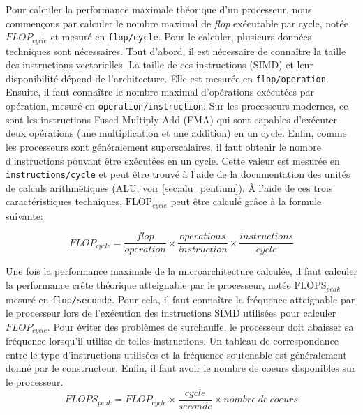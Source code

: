         Pour calculer la performance maximale théorique d'un processeur, nous commençons par calculer le nombre maximal de \textit{flop} exécutable par cycle, notée $FLOP_{cycle}$ et mesuré en \verb=flop/cycle=. Pour le calculer, plusieurs données techniques sont nécessaires. 
        Tout d'abord, il est nécessaire de connaître la taille des instructions vectorielles. La taille de ces instructions (SIMD) et leur disponibilité dépend de l'architecture. Elle est mesurée en \verb=flop/operation=.
        Ensuite, il faut connaître le nombre maximal d'opérations exécutées par opération, mesuré en \verb=operation/instruction=. Sur les processeurs modernes, ce sont les instructions Fused Multiply Add (FMA) qui sont capables d'exécuter deux opérations (une multiplication et une addition) en un cycle.
        Enfin, comme les processeurs sont généralement superscalaires, il faut obtenir le nombre d'instructions pouvant être exécutées en un cycle. Cette valeur est mesurée en \verb=instructions/cycle= et peut être trouvé à l'aide de la documentation des unités de calculs arithmétiques (ALU, voir \autoref{sec:alu_pentium}).
        À l'aide de ces trois caractéristiques techniques, $\text{FLOP}_{cycle}$ peut être calculé grâce à la formule suivante:
        
        \begin{equation}
        \label{eq:floc}
            FLOP_{cycle} = \frac{flop}{operation} \times \frac{operations}{instruction} \times \frac{instructions}{cycle}
        \end{equation}
        
        Une fois la performance maximale de la microarchitecture calculée, il faut calculer la performance crête théorique atteignable par le processeur, notée $\text{FLOPS}_{peak}$ mesuré en \verb=flop/seconde=. Pour cela, il faut connaître la fréquence atteignable par le processeur lors de l'exécution des instructions SIMD utilisées pour calculer $FLOP_{cycle}$. Pour éviter des problèmes de surchauffe, le processeur doit abaisser sa fréquence lorsqu'il utilise de telles instructions. Un tableau de correspondance entre le type d'instructions utilisées et la fréquence soutenable est généralement donné par le constructeur. Enfin, il faut avoir le nombre de coeurs disponibles sur le processeur.
        \begin{equation}
        \label{eq:flops}
            FLOPS_{peak} = FLOP_{cycle} \times \frac{cycle}{seconde} \times nombre\ de\ coeurs
        \end{equation}
    
